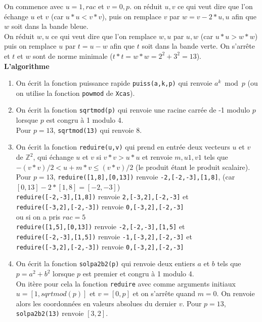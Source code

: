 \documentclass[a4paper,11pt]{book}
\newcommand{\Z}{{\mathbb{Z}}}
\begin{document}
On commence avec $u=1,rac$ et $v=0,p$. on r\'eduit $u,v$ ce qui veut dire 
que l'on \'echange $u$ et $v$ (car  $u*u<v*v$), puis on remplace $v$ par 
$w=v-2*u,u$ afin que $w$ soit dans la bande bleue.\\
On r\'eduit $w,u$ ce qui veut dire que l'on remplace $w,u$ par $u,w$ (car  
$u*u>w*w$) puis on remplace $u$ par $t=u-w$ afin que $t$ soit dans la bande 
verte. On s'arr\^ete et $t$ et $w$ sont de norme minimale ($t*t=w*w=2^2+3^2=13$).\\

{\bf L'algorithme}
\begin{enumerate}
\item On \'ecrit la fonction puissance rapide {\tt puiss(a,k,p)} qui renvoie
$a^k \bmod p$ (ou on utilise la fonction {\tt powmod} de {\tt Xcas}).
\item On \'ecrit la fonction {\tt sqrtmod(p)} qui renvoie une racine carr\'ee 
de -1 modulo $p$ lorsque $p$ est congru \`a 1 modulo 4.\\
Pour $p=13$, {\tt sqrtmod(13)} qui renvoie 8.

\item On \'ecrit la fonction {\tt reduire(u,v)} qui prend en entr\'ee deux 
vecteurs $u$ et $v$ de $\Z^2$, qui \'echange $u$ et $v$ si $v*v>u*u$ et renvoie 
$m,u1,v1$ tels que $-(v*v)/2<u+m*v\leq (v*v)/2$ (le produit \'etant le produit 
scalaire).\\
Pour $p=13$, {\tt reduire([1,8],[0,13])} renvoie {\tt -2,[-2,-3],[1,8]}, (car 
$[0,13]-2*[1,8]=[-2,-3]$)\\
{\tt reduire([-2,-3],[1,8])} renvoie {\tt 2,[-3,2],[-2,-3]} et\\
{\tt reduire([-3,2],[-2,-3])} renvoie {\tt 0,[-3,2],[-2,-3]}\\
ou si on a pris $rac=5$\\
{\tt reduire([1,5],[0,13])} renvoie {\tt -2,[-2,-3],[1,5]} et \\
{\tt reduire([-2,-3],[1,5])} renvoie {\tt -1,[-3,2],[-2,-3]} et \\
{\tt reduire([-3,2],[-2,-3])} renvoie {\tt 0,[-3,2],[-2,-3]}
\item On \'ecrit la fonction {\tt solpa2b2(p)} qui renvoie deux entiers $a$ et 
$b$ tels que $p=a^2+b^2$ lorsque $p$ est premier et congru \`a 1 modulo 4.\\
On it\`ere pour cela la fonction {\tt reduire} avec comme arguments initiaux 
$u=[1,sqrtmod(p)]$ et $v=[0,p]$ et on s'arr\^ete quand $m=0$.
On renvoie alors les coordonn\'ees en valeurs absolues du dernier $v$.
Pour $p=13$, {\tt solpa2b2(13)} renvoie $[3,2]$.
\end{enumerate}
\end{document}
